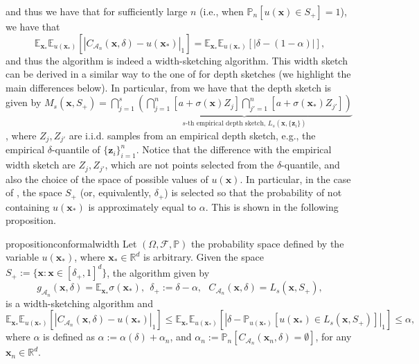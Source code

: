 \documentclass{article} %
\theoremstyle{remark}
\theoremstyle{definition}      %
\begin{document}
and thus we have that for sufficiently large $n$ (i.e., when $\mathbb{P}_n[ u(\bm{x}) \in S_+] = 1$), we have that  
\begin{equation} \label{eq:width_sketch_bias2}
\mathbb{E}_{\bm{x}_*} \mathbb{E}_{u(\bm{x_*})}[|C_{\mathcal{A}_n}(\bm{x},\delta) - u(\bm{x_*})|_1] = \mathbb{E}_{\bm{x}_*} \mathbb{E}_{u(\bm{x_*})}[|\delta - (1 - \alpha)|],
\end{equation}
and thus the algorithm is indeed a width-sketching algorithm. This width sketch can be derived in a similar way to the one of \cite{angelopoulos2024conformal} for depth sketches (we highlight the main differences below). In particular, from \cite{angelopoulos2024conformal} we have that the depth sketch is given by $M_s(\bm{x}, S_+) = \bigcap_{j=1}^{s} \underbrace{\left(\bigcap_{j=1}^{n} \left[a + \sigma(\bm{x}) Z_{j} \right]\bigcap_{j'=1}^{n} \left[a + \sigma(\bm{x_*}) Z_{j'} \right]\right)}_{\text{$s$-th empirical depth sketch, }L_s(\bm{x},\{ \bm{z}_i \})}$, where $Z_j,Z_{j'}$ are i.i.d. samples from an empirical depth sketch, e.g., the empirical $\delta$-quantile of $\{ \bm z_i \}_{i=1}^{n}$. Notice that the difference with the empirical width sketch are $Z_j,Z_{j'}$, which are not points selected from the $\delta$-quantile, and also the choice of the space of possible values of $u(\bm{x})$. In particular, in the case of \cite{angelopoulos2024conformal}, the space $S_+$ (or, equivalently, $\delta_{+}$) is selected so that the probability of not containing $u(\bm{x_*})$ is approximately equal to $\alpha$. This is shown in the following proposition.
\begin{restatable}{proposition}{conformalwidth}\label{prop:conformal_width}
  Let $(\Omega,\mathcal{F},\mathbb{P})$ the probability space defined by the variable $u(\bm{x_*})$, where $\bm{x_*} \in \mathbb{R}^d$ is arbitrary. Given the space $S_+ := \{\bm{x}: \bm{x} \in [\delta_+,1] ^d\}$, the algorithm given by 
  \begin{equation} 
  g_{\mathcal{A}_n}(\bm{x},\delta) = \mathbb{E}_{\bm{x}_*} \sigma(\bm{x_*}),~~\delta_{+} := \delta - \alpha,~~~C_{\mathcal{A}_n}(\bm{x},\delta) = L_s(\bm{x},S_+),
\end{equation}
is a width-sketching algorithm and
\begin{equation}
\mathbb{E}_{\bm{x}_*} \mathbb{E}_{u(\bm{x_*})}[|C_{\mathcal{A}_n}(\bm{x},\delta) - u(\bm{x_*})|_1]  \leq \mathbb{E}_{\bm{x}_*} \mathbb{E}_{u(\bm{x_*})}[|\delta - \mathbb{P}_{u(\bm{x_*})}[u(\bm{x_*}) \in L_s(\bm{x},S_+)]|_1] \leq \alpha,
\end{equation}
where $\alpha$ is defined as $\alpha :=\alpha(\delta) + \alpha_n$, and $\alpha_n :=\mathbb{P}_n[C_{\mathcal{A}_n}(\bm{x}_n,\delta) = \emptyset]$, for any $\bm{x}_n \in \mathbb{R}^d$. 
\end{restatable}
\end{document}
